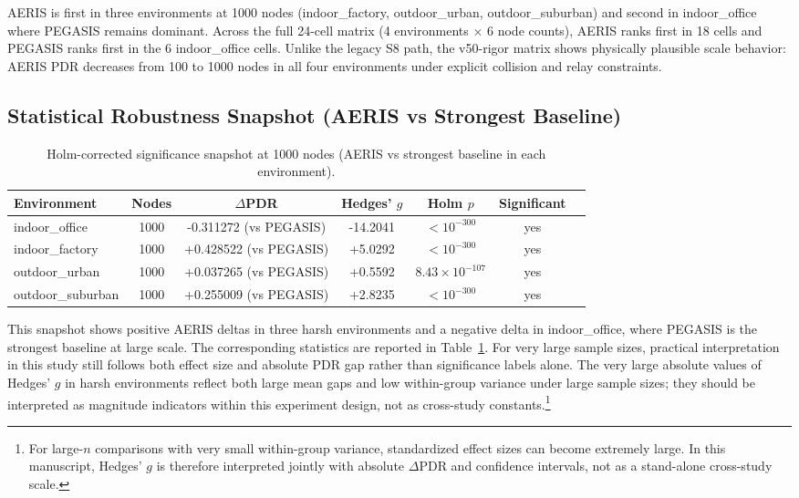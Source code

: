﻿\documentclass[sensors,article,submit,moreauthors,pdftex]{Definitions/mdpi}
\begin{document}
AERIS is first in three environments at 1000 nodes (indoor\_factory, outdoor\_urban, outdoor\_suburban) and second in indoor\_office where PEGASIS remains dominant.
Across the full 24-cell matrix (4 environments $\times$ 6 node counts), AERIS ranks first in 18 cells and PEGASIS ranks first in the 6 indoor\_office cells.
Unlike the legacy S8 path, the v50-rigor matrix shows physically plausible scale behavior: AERIS PDR decreases from 100 to 1000 nodes in all four environments under explicit collision and relay constraints.

\subsection{Statistical Robustness Snapshot (AERIS vs Strongest Baseline)}
\begin{table}[H]
\caption{Holm-corrected significance snapshot at 1000 nodes (AERIS vs strongest baseline in each environment).}
\label{tab:robust_snapshot}
\centering
\begin{tabular}{lcccccc}
\toprule
Environment & Nodes & $\Delta$PDR & Hedges' $g$ & Holm $p$ & Significant \\
\midrule
indoor\_office    & 1000 & -0.311272 (vs PEGASIS) & -14.2041 & $<10^{-300}$ & yes \\
indoor\_factory   & 1000 & +0.428522 (vs PEGASIS) & +5.0292 & $<10^{-300}$ & yes \\
outdoor\_urban    & 1000 & +0.037265 (vs PEGASIS) & +0.5592 & $8.43\times10^{-107}$ & yes \\
outdoor\_suburban & 1000 & +0.255009 (vs PEGASIS) & +2.8235 & $<10^{-300}$ & yes \\
\bottomrule
\end{tabular}
\end{table}

This snapshot shows positive AERIS deltas in three harsh environments and a negative delta in indoor\_office, where PEGASIS is the strongest baseline at large scale.
The corresponding statistics are reported in Table~\ref{tab:robust_snapshot}.
For very large sample sizes, practical interpretation in this study still follows both effect size and absolute PDR gap rather than significance labels alone.
The very large absolute values of Hedges' $g$ in harsh environments reflect both large mean gaps and low within-group variance under large sample sizes; they should be interpreted as magnitude indicators within this experiment design, not as cross-study constants.\footnote{For large-\(n\) comparisons with very small within-group variance, standardized effect sizes can become extremely large. In this manuscript, Hedges' \(g\) is therefore interpreted jointly with absolute \(\Delta\)PDR and confidence intervals, not as a stand-alone cross-study scale.}
\end{document}
